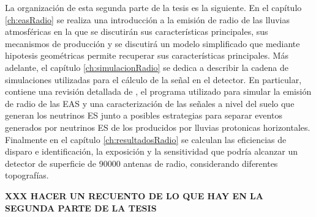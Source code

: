 La organizaci\'on de esta segunda parte de la tesis es la siguiente.
En el capítulo \ref{ch:easRadio} se realiza una introducción a la emisión de radio de las lluvias atmosféricas en la que se discutirán sus características principales, sus mecanismos de producción y se discutirá un modelo simplificado que mediante hipotesis geom\'etricas permite recuperar sus características principales.
Más adelante, el capítulo \ref{ch:simulacionRadio} se dedica a describir la cadena de simulaciones utilizadas para el c\'alculo de la se\~nal en el detector. 
En particular, contiene una revisión detallada de \zhs{}, el programa utilizado para simular la emisión de radio de las EAS y una caracterización de las señales a nivel del suelo que generan los neutrinos ES junto a posibles estrategias para separar eventos generados por neutrinos ES de los producidos por lluvias protonicas horizontales.
Finalmente en el capítulo \ref{ch:resultadosRadio} se calculan las eficiencias de disparo e identificaci\'on, la exposición y la sensitividad que podría alcanzar un detector de superficie de 90000 antenas de radio, considerando diferentes topografías.

\textbf{XXX HACER UN RECUENTO DE LO QUE HAY EN LA SEGUNDA PARTE DE LA TESIS}

